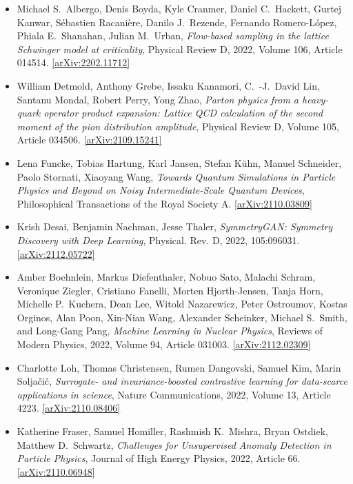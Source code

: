 \begin{itemize}
\item Michael S.\  Albergo, Denis Boyda, Kyle Cranmer, Daniel C.\  Hackett, Gurtej Kanwar, Sébastien Racanière, Danilo J.\  Rezende, Fernando Romero-López, Phiala E.\  Shanahan, Julian M.\  Urban, \textit{Flow-based sampling in the lattice Schwinger model at criticality}, Physical Review D, 2022, Volume 106, Article 014514. \href{https://arxiv.org/abs/2202.11712}{[arXiv:2202.11712]} 
\item William Detmold, Anthony Grebe, Issaku Kanamori, C.\ -J.\  David Lin, Santanu Mondal, Robert Perry, Yong Zhao, \textit{Parton physics from a heavy-quark operator product expansion: Lattice QCD calculation of the second moment of the pion distribution amplitude}, Physical Review D, Volume 105, Article 034506. \href{https://arxiv.org/abs/2109.15241}{[arXiv:2109.15241]} 
\item Lena Funcke, Tobias Hartung, Karl Jansen, Stefan Kühn, Manuel Schneider, Paolo Stornati, Xiaoyang Wang, \textit{Towards Quantum Simulations in Particle Physics and Beyond on Noisy Intermediate-Scale Quantum Devices}, Philosophical Transactions of the Royal Society A. \href{https://arxiv.org/abs/2110.03809}{[arXiv:2110.03809]} 
\item Krish Desai, Benjamin Nachman, Jesse Thaler, \textit{SymmetryGAN: Symmetry Discovery with Deep Learning}, Physical. Rev. D, 2022, 105:096031. \href{https://arxiv.org/abs/2112.05722}{[arXiv:2112.05722]} 
\item Amber Boehnlein, Markus Diefenthaler, Nobuo Sato, Malachi Schram, Veronique Ziegler, Cristiano Fanelli, Morten Hjorth-Jensen, Tanja Horn, Michelle P.\  Kuchera, Dean Lee, Witold Nazarewicz, Peter Ostroumov, Kostas Orginos, Alan Poon, Xin-Nian Wang, Alexander Scheinker, Michael S.\  Smith, and Long-Gang Pang, \textit{Machine Learning in Nuclear Physics}, Reviews of Modern Physics, 2022, Volume 94, Article 031003. \href{https://arxiv.org/abs/2112.02309}{[arXiv:2112.02309]} 
\item Charlotte Loh, Thomas Christensen, Rumen Dangovski, Samuel Kim, Marin Soljačić, \textit{Surrogate- and invariance-boosted contrastive learning for data-scarce applications in science}, Nature Communications, 2022, Volume 13, Article 4223. \href{https://arxiv.org/abs/2110.08406}{[arXiv:2110.08406]} 
\item Katherine Fraser, Samuel Homiller, Rashmish K.\  Mishra, Bryan Ostdiek, Matthew D.\  Schwartz, \textit{Challenges for Unsupervised Anomaly Detection in Particle Physics}, Journal of High Energy Physics, 2022, Article 66. \href{https://arxiv.org/abs/2110.06948}{[arXiv:2110.06948]} 

\end{itemize}
